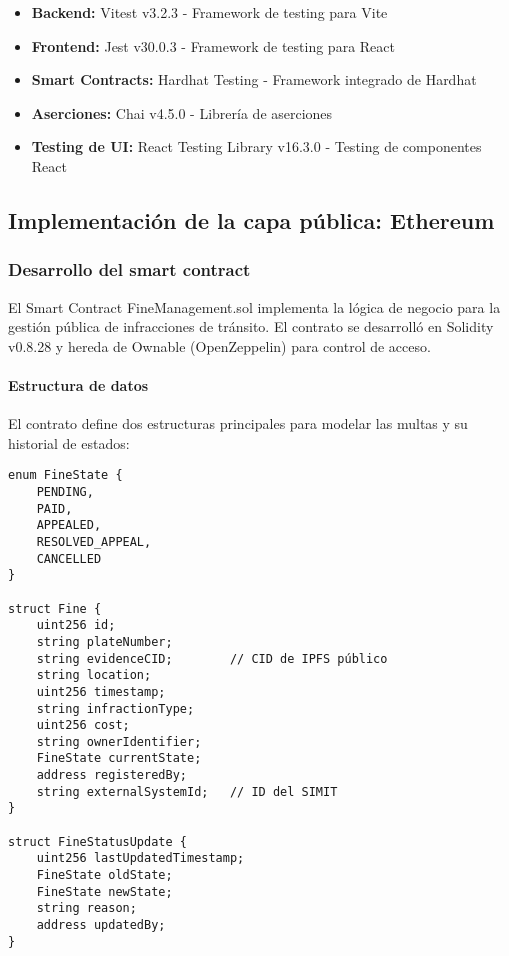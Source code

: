 \begin{itemize}
    \item \textbf{Backend:} Vitest v3.2.3 - Framework de testing para Vite
    \item \textbf{Frontend:} Jest v30.0.3 - Framework de testing para React
    \item \textbf{Smart Contracts:} Hardhat Testing - Framework integrado de Hardhat
    \item \textbf{Aserciones:} Chai v4.5.0 - Librería de aserciones
    \item \textbf{Testing de UI:} React Testing Library v16.3.0 - Testing de componentes React
\end{itemize}

\subsection{Implementación de la capa pública: Ethereum}

\subsubsection{Desarrollo del smart contract}

El Smart Contract FineManagement.sol implementa la lógica de negocio para la gestión pública de infracciones de tránsito. El contrato se desarrolló en Solidity v0.8.28 y hereda de Ownable (OpenZeppelin) para control de acceso.

\paragraph{Estructura de datos}
El contrato define dos estructuras principales para modelar las multas y su historial de estados:

\begin{verbatim}
enum FineState { 
    PENDING, 
    PAID, 
    APPEALED, 
    RESOLVED_APPEAL, 
    CANCELLED 
}

struct Fine {
    uint256 id;
    string plateNumber;
    string evidenceCID;        // CID de IPFS público
    string location;
    uint256 timestamp;
    string infractionType;
    uint256 cost;
    string ownerIdentifier;
    FineState currentState;
    address registeredBy;
    string externalSystemId;   // ID del SIMIT
}

struct FineStatusUpdate {
    uint256 lastUpdatedTimestamp;
    FineState oldState;
    FineState newState;
    string reason;
    address updatedBy;
}
\end{verbatim}

